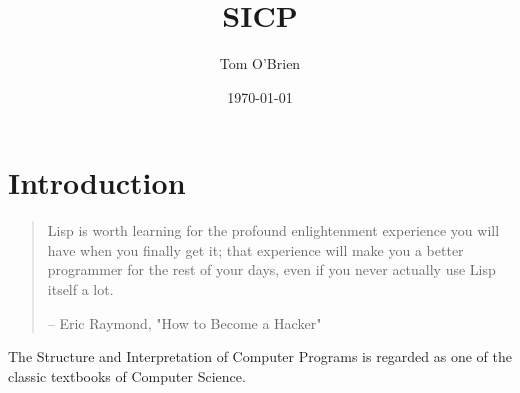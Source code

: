 \documentclass[11pt]{article}
\author{Tom O'Brien}
\date{\today}
\title{SICP}
\begin{document}
\maketitle
\tableofcontents


\section{Introduction}
\label{sec-1}
\begin{quote}
Lisp is worth learning for the profound enlightenment experience you will have when you finally get it; that experience will make you a better programmer for the rest of your days, even if you never actually use Lisp itself a lot.

-- Eric Raymond, "How to Become a Hacker"
\end{quote}
The Structure and Interpretation of Computer Programs is regarded as
one of the classic textbooks of Computer Science.
\end{document}
